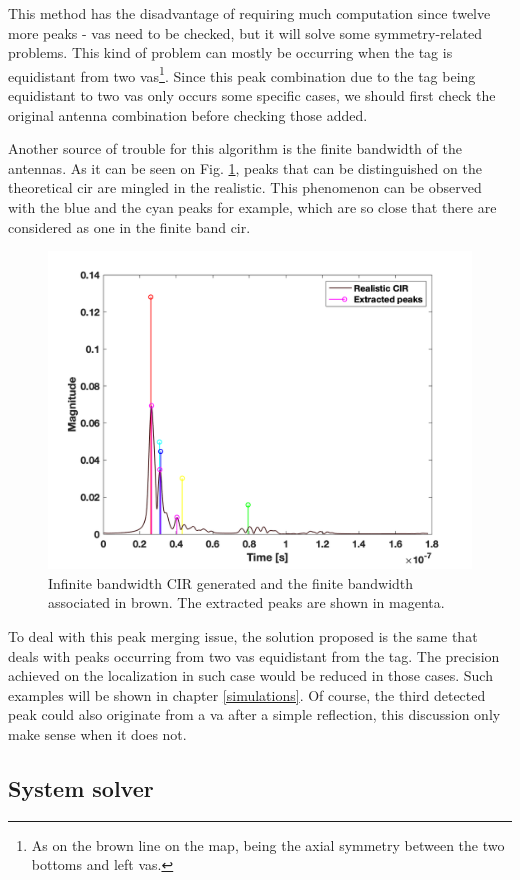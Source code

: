 This method has the disadvantage of requiring much computation since twelve more peaks - \glspl{va} need to be checked, but it will solve some symmetry-related problems. This kind of problem can mostly be occurring when the tag is equidistant from two \glspl{va}\footnote{As on the brown line on the map, being the axial symmetry between the two bottoms and left \glspl{va}.}. Since this peak combination due to the tag being equidistant to two \glspl{va} only occurs some specific cases, we should first check the original antenna combination before checking those added.
\vspace{2mm}

Another source of trouble for this algorithm is the finite bandwidth of the antennas. As it can be seen on Fig. \ref{fig:inftofin}, peaks that can be distinguished on the theoretical \gls{cir} are mingled in the realistic. This phenomenon can be observed with the blue and the cyan peaks for example, which are so close that there are considered as one in the finite band \gls{cir}.

\begin{figure}[H]
\centering
\includegraphics[width=.55\linewidth]{Images/Fig_inf_to_fin.png}
\caption{Infinite bandwidth CIR generated and the finite bandwidth associated in brown. The extracted peaks are shown in magenta. \label{fig:inftofin}}
\end{figure}

To deal with this peak merging issue, the solution proposed is the same that deals with peaks occurring from two \glspl{va} equidistant from the tag. The precision achieved on the localization in such case would be reduced  in those cases. Such examples will be shown in chapter \ref{simulations}. Of course, the third detected peak could also originate from a \gls{va} after a simple reflection, this discussion only make sense when it does not.
\vspace{2mm}

\subsection{System solver}

